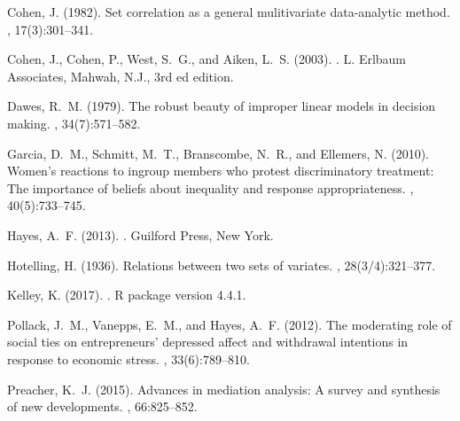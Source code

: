 \documentclass[11pt]{article}
\begin{document}
\begin{thebibliography}{}

Cohen, J. (1982).
\newblock Set correlation as a general mulitivariate data-analytic method.
, 17(3):301--341.

Cohen, J., Cohen, P., West, S.~G., and Aiken, L.~S. (2003).
.
\newblock L. Erlbaum Associates, Mahwah, N.J., 3rd ed edition.

Dawes, R.~M. (1979).
\newblock The robust beauty of improper linear models in decision making.
, 34(7):571--582.

Garcia, D.~M., Schmitt, M.~T., Branscombe, N.~R., and Ellemers, N. (2010).
\newblock Women's reactions to ingroup members who protest discriminatory
  treatment: The importance of beliefs about inequality and response
  appropriateness.
, 40(5):733--745.

Hayes, A.~F. (2013).
.
\newblock Guilford Press, New York.

Hotelling, H. (1936).
\newblock Relations between two sets of variates.
, 28(3/4):321--377.

Kelley, K. (2017).
.
\newblock R package version 4.4.1.

Pollack, J.~M., Vanepps, E.~M., and Hayes, A.~F. (2012).
\newblock The moderating role of social ties on entrepreneurs' depressed affect
  and withdrawal intentions in response to economic stress.
, 33(6):789--810.

Preacher, K.~J. (2015).
\newblock Advances in mediation analysis: A survey and synthesis of new
  developments.
, 66:825--852.


\end{thebibliography}
\end{document}

